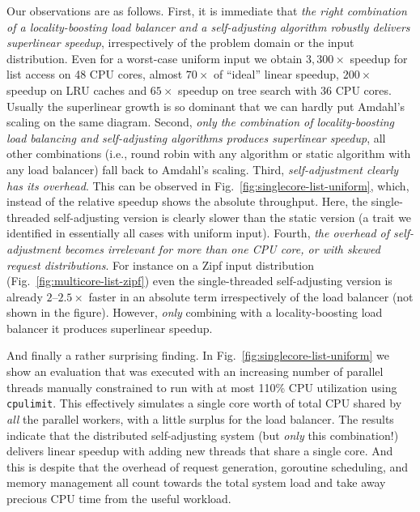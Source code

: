 Our observations are as follows. First, it is immediate that \emph{the right combination of a locality-boosting load balancer and a self-adjusting algorithm robustly delivers superlinear speedup}, irrespectively of the problem domain or the input distribution. Even for a worst-case uniform input we obtain $3,300\times$ speedup for list access on 48 CPU cores, almost $70\times$ of ``ideal'' linear speedup, $200\times$ speedup on LRU caches and $65\times$ speedup on tree search with 36 CPU cores. Usually the superlinear growth is so dominant that we can hardly put Amdahl's scaling on the same diagram.  Second, \emph{only the combination of locality-boosting load balancing and self-adjusting algorithms produces superlinear speedup}, all other combinations (i.e., round robin with any algorithm or static algorithm with any load balancer) fall back to Amdahl's scaling.  Third, \emph{self-adjustment clearly has its overhead}. This can be observed in Fig.~\ref{fig:singlecore-list-uniform}, which, instead of the relative speedup shows the absolute throughput. Here, the single-threaded self-adjusting version is clearly slower than the static version (a trait we identified in essentially all cases with uniform input). Fourth, \emph{the overhead of self-adjustment becomes irrelevant for more than one CPU core, or with skewed request distributions}. For instance on a Zipf input distribution (Fig.~\ref{fig:multicore-list-zipf}) even the single-threaded self-adjusting version is already $2$--$2.5\times$ faster in an absolute term irrespectively of the load balancer (not shown in the figure). However, \emph{only} combining with a locality-boosting load balancer it produces superlinear speedup.

And finally a rather surprising finding. In Fig.~\ref{fig:singlecore-list-uniform} we show an evaluation that was executed with an increasing number of parallel threads manually constrained to run with at most 110\% CPU utilization using \texttt{cpulimit}. This effectively simulates a single core worth of total CPU shared by \emph{all} the parallel workers, with a little surplus for the load balancer. The results indicate that the distributed self-adjusting system (but \emph{only} this combination!) delivers linear speedup with adding new threads that share a single core. %
And this is despite that the overhead of request generation, goroutine scheduling, and memory management all count towards the total system load and take away precious CPU time from the useful workload.

